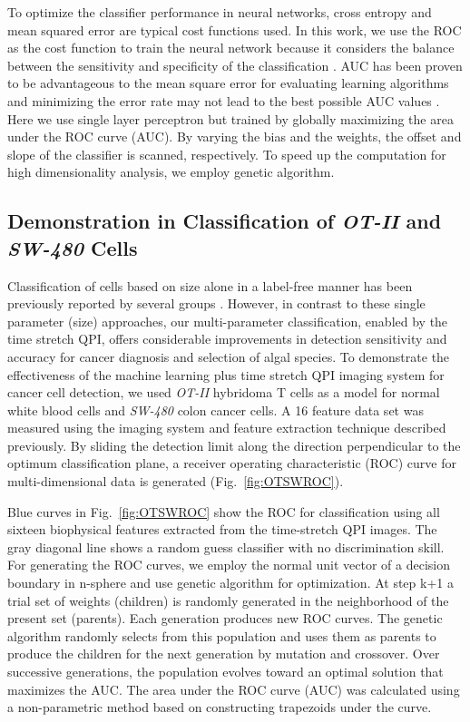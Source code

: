 \documentclass[aps,pra,reprint,longbibliography,superscriptaddress]{revtex4-1}
\begin{document}
To optimize the classifier performance in neural networks, cross entropy and mean squared error are typical cost functions used. In this work, we use the ROC as the cost function to train the neural network because it considers the balance between the sensitivity and specificity of the classification \cite{hanley1982meaning}. AUC has been proven to be advantageous to the mean square error for evaluating learning algorithms \cite{verrelst1998use} and minimizing the error rate may not lead to the best possible AUC values \cite{cortes2004auc,huang2005using}. Here we use single layer perceptron but trained by globally maximizing the area under the ROC curve (AUC). By varying the bias and the weights, the offset and slope of the classifier is scanned, respectively. To speed up the computation for high dimensionality analysis, we employ genetic algorithm. 

\subsection{Demonstration in Classification of \textit{OT-II} and \textit{SW-480} Cells}

Classification of cells based on size alone in a label-free manner has been previously reported by several groups \cite{vona2000isolation}. However, in contrast to these single parameter (size) approaches, our multi-parameter classification, enabled by the time stretch QPI, offers considerable improvements in detection sensitivity and accuracy for cancer diagnosis and selection of algal species. To demonstrate the effectiveness of the machine learning plus time stretch QPI imaging system for cancer cell detection, we used \textit{OT-II} hybridoma T cells as a model for normal white blood cells and \textit{SW-480} colon cancer cells. A 16 feature data set was measured using the imaging system and feature extraction technique described previously. By sliding the detection limit along the direction perpendicular to the optimum classification plane, a receiver operating characteristic (ROC) curve for multi-dimensional data is generated (Fig.~\ref{fig:OTSWROC}).

Blue curves in Fig.~\ref{fig:OTSWROC} show the ROC for classification using all sixteen biophysical features extracted from the time-stretch QPI images. The gray diagonal line shows a random guess classifier with no discrimination skill. For generating the ROC curves, we employ the normal unit vector of a decision boundary in n-sphere and use genetic algorithm for optimization. At step k+1 a trial set of weights (children) is randomly generated in the neighborhood of the present set (parents). Each generation produces new ROC curves. The genetic algorithm randomly selects from this population and uses them as parents to produce the children for the next generation by mutation and crossover. Over successive generations, the population evolves toward an optimal solution that maximizes the AUC. The area under the ROC curve (AUC) was calculated using a non-parametric method based on constructing trapezoids under the curve.
\end{document}
